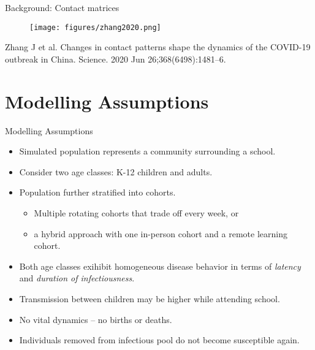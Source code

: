 \documentclass[8pt]{beamer}
\begin{document}
\begin{frame}{Background: Contact matrices}
\begin{figure}
    \centering
    \texttt{[image: figures/zhang2020.png]}
\end{figure}

Zhang J et al. Changes in contact patterns shape the dynamics of the COVID-19 outbreak in China. Science. 2020 Jun 26;368(6498):1481–6. 
\end{frame}

\section{Modelling Assumptions}

\begin{frame}{Modelling Assumptions}
\begin{itemize}
    \item Simulated population represents a community surrounding a school.
    \item Consider two age classes: K-12 children and adults.
    \item Population further stratified into cohorts.
    \begin{itemize}
        \item Multiple rotating cohorts that trade off every week, or
        \item a hybrid approach with one in-person cohort and a remote learning cohort.
    \end{itemize}
    \item Both age classes exihibit homogeneous disease behavior in terms of {\it latency} and {\it duration of infectiousness}.
    \item Transmission between children may be higher while attending school.
    \item No vital dynamics -- no births or deaths.
    \item Individuals removed from infectious pool do not become susceptible again.
\end{itemize}
\end{frame}
\end{document}
